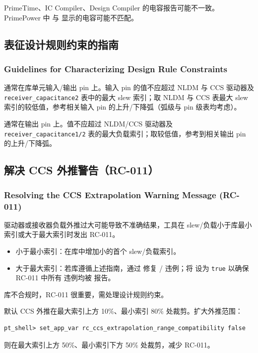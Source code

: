 \begin{noteBox}
PrimeTime、IC Compiler、Design Compiler 的电容报告可能不一致。PrimePower 中  与  显示的电容可能不匹配。
\end{noteBox}

\subsection{表征设计规则约束的指南}
\subsubsection*{Guidelines for Characterizing Design Rule Constraints}

 通常在库单元输入/输出 pin 上。输入 pin 的值不应超过 NLDM 与 CCS 驱动器及 \texttt{receiver\_capacitance2} 表中的最大 slew 索引；取 NLDM 与 CCS 表最大 slew 索引的较低值，参考相关输入 pin 的上升/下降弧（弧级与 pin 级表均考虑）。

 通常在输出 pin 上。值不应超过 NLDM/CCS 驱动器及 \texttt{receiver\_capacitance1/2} 表的最大负载索引；取较低值，参考到相关输出 pin 的上升/下降弧。

\subsection{解决 CCS 外推警告（RC-011）}
\subsubsection*{Resolving the CCS Extrapolation Warning Message (RC-011)}

驱动器或接收器负载外推过大可能导致不准确结果，工具在 slew/负载小于库最小索引或大于最大索引时发出 RC-011。
\begin{itemize}
  \item 小于最小索引：在库中增加小的首个 slew/负载索引。
  \item 大于最大索引：若库遵循上述指南，通过  修复 / 违例；将  设为 \texttt{true} 以确保 RC-011 中所有  违例均被  报告。
\end{itemize}

库不合规时，RC-011 很重要，需处理设计规则约束。

默认 CCS 外推在最大索引上方 10\%、最小索引 80\% 处裁剪。扩大外推范围：
\begin{lstlisting}
pt_shell> set_app_var rc_ccs_extrapolation_range_compatibility false
\end{lstlisting}
则在最大索引上方 50\%、最小索引下方 50\% 处裁剪，减少 RC-011。

